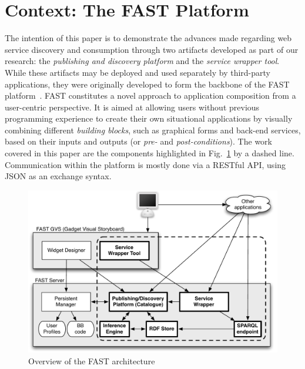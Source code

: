 
\section{Context: The FAST Platform}
\label{sec:use_case}

The intention of this paper is to demonstrate the advances made regarding web service discovery and consumption through two artifacts developed as part of our research: the \emph{publishing and discovery platform} and the \emph{service wrapper tool}. While these artifacts may be deployed and used separately by third-party applications, they were originally developed to form the backbone of the FAST platform~\cite{hoyer2009fast}.
FAST constitutes a novel approach to application composition from a user-centric perspective. It is aimed at allowing users without previous programming experience to create their own situational applications by visually combining different \emph{building blocks}, such as graphical forms and back-end services, based on their inputs and outputs (or \emph{pre-} and \emph{post-conditions}). The work covered in this paper are the components highlighted in Fig.~\ref{fig:fast_architecture} by a dashed line. Communication within the platform is mostly done via a RESTful API, using JSON as an exchange syntax.

\begin{figure}[ht]
  \begin{center}
    \includegraphics[width=\linewidth]{images/fast_architecture.pdf}
    \caption{Overview of the FAST architecture}
    \label{fig:fast_architecture}
  \end{center}
\end{figure}

